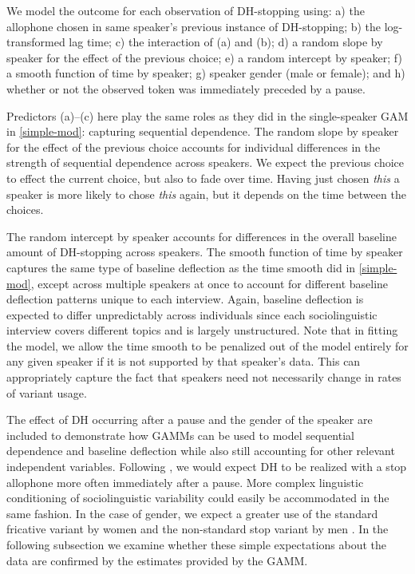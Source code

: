 \documentclass[12pt]{article}
\begin{document}
We model the outcome for each observation of DH-stopping using: a) the allophone chosen in same speaker's previous instance of DH-stopping; b) the log-transformed lag time; c) the interaction of (a) and (b); d) a random slope by speaker for the effect of the previous choice; e) a random intercept by speaker; f) a smooth function of time by speaker; g) speaker gender (male or female); and h) whether or not the observed token was immediately preceded by a pause. 

Predictors (a)--(c) here play the same roles as they did in the single-speaker GAM in \eqref{simple-mod}: capturing sequential dependence. The random slope by speaker for the effect of the previous choice accounts for individual differences in the strength of sequential dependence across speakers. We expect the previous choice to effect the current choice, but also to fade over time. Having just chosen \emph{this} a speaker is more likely to chose \emph{this} again, but it depends on the time between the choices. 

The random intercept by speaker accounts for differences in the overall baseline amount of DH-stopping across speakers.  The smooth function of time by speaker captures the same type of baseline deflection as the time smooth did in \eqref{simple-mod}, except across multiple speakers at once to account for different baseline deflection patterns unique to each interview. Again, baseline deflection is expected to differ unpredictably across individuals since each sociolinguistic interview covers different topics and is largely unstructured. Note that in fitting the model, we allow the time smooth to be penalized out of the model entirely for any given speaker if it is not supported by that speaker's data. This can appropriately capture the fact that speakers need not necessarily change in rates of variant usage.

The effect of DH occurring after a pause and the gender of the speaker are included to demonstrate how GAMMs can be used to model sequential dependence and baseline deflection while also still accounting for other relevant independent variables. Following \cite{Tamminga:2014b}, we would expect DH to be realized with a stop allophone more often immediately after a pause. More complex linguistic conditioning of sociolinguistic variability could easily be accommodated in the same fashion.  In the case of gender, we expect a greater use of the standard fricative variant by women and the non-standard stop variant by men \citep{Labov:2001}. In the following subsection we examine whether these simple expectations about the data are confirmed by the estimates provided by the GAMM.
\end{document}
